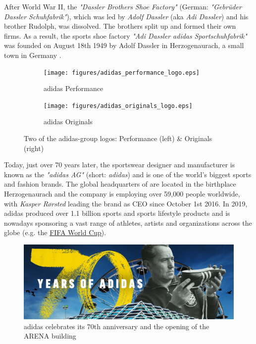 

After World War II, the \textit{"Dassler Brothers Shoe Factory"} (German: \textit{"Gebrüder Dassler Schuhfabrik"}), which was led by \textit{Adolf Dassler} (aka \textit{Adi Dassler}) and his brother Rudolph, was dissolved. The brothers split up and formed their own firms. As a result, the sports shoe factory \textit{"Adi Dassler adidas Sportschuhfabrik"} was founded on August 18th 1949 by Adolf Dassler in Herzogenaurach, a small town in Germany \citep{adidas-group}. \\

\begin{figure}[H]
\centering
\begin{subfigure}{.4\textwidth}
  \centering
  \texttt{[image: figures/adidas\_performance\_logo.eps]}
  \caption{adidas Performance}
  \label{fig:adidas_performance_logo}
\end{subfigure}
\begin{subfigure}{.4\textwidth}
  \centering
  \texttt{[image: figures/adidas\_originals\_logo.eps]}
  \caption{adidas Originals}
  \label{fig:adidas_originals_logo}
\end{subfigure}
\caption{Two of the adidas-group logos: Performance (left) \& Originals (right) \\ \citep{adidasmediacenter}}
\label{fig:adidas_logos}
\end{figure} 


Today, just over 70 years later, the sportswear designer and manufacturer is known as the \textit{"adidas AG"} (short: \textit{adidas}) and is one of the world's biggest sports and fashion brands. The global headquarters of are located in the birthplace Herzogenaurach and the company is employing over 59,000 people worldwide, with \textit{Kasper R\o rsted} leading the brand as CEO since October 1st 2016. In 2019, adidas produced over 1.1 billion sports and sports lifestyle products and is nowadays sponsoring a vast range of athletes, artists and organizations across the globe (e.g. the  \href{https://www.fifa.com/worldcup/}{FIFA World Cup\texttrademark}).\\

\begin{figure}[H]
\centering
  \includegraphics[width=.95\linewidth]{figures/adidas_70_years.eps}
  \caption{adidas celebrates its 70th anniversary and the opening of the ARENA building \citep{adidas70years}}
  \label{fig:adidas_70_years}
\end{figure}


